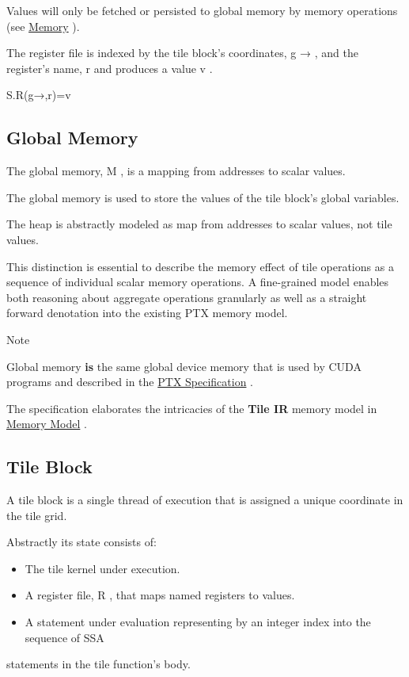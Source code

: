 \documentclass{article}
\begin{document}
Values will only be fetched or persisted to global memory by memory operations (see \href{https://docs.nvidia.com/cuda/tile-ir/latest/sections/operations.html#op-group-memory}{Memory} ).


The register file is indexed by the tile block's coordinates, g → , and the register's name, r and produces a value v .


S.R(g→,r)=v


\subsection{Global Memory}

The global memory, M , is a mapping from addresses to scalar values.


The global memory is used to store the values of the tile block's global variables.


The heap is abstractly modeled as map from addresses to scalar values, not tile values.

This distinction is essential to describe the memory effect of tile operations as a sequence of individual scalar memory operations. A fine-grained model enables both reasoning about aggregate operations granularly as well as a straight forward denotation into the existing PTX memory model.


Note


Global memory \textbf{is} the same global device memory that is used by CUDA programs and described in the \href{https://docs.nvidia.com/cuda/parallel-thread-execution/#state-spaces}{PTX Specification} .


The specification elaborates the intricacies of the \textbf{Tile IR} memory model in \href{https://docs.nvidia.com/cuda/tile-ir/latest/sections/memory_model.html#section-memory-model}{Memory Model} .



\subsection{Tile Block}

A tile block is a single thread of execution that is assigned a unique coordinate in the tile grid.


Abstractly its state consists of:


\begin{itemize}
\item The tile kernel under execution.
\item A register file, R , that maps named registers to values.
\item A statement under evaluation representing by an integer index into the sequence of SSA
\end{itemize}
statements in the tile function's body.
\end{document}
